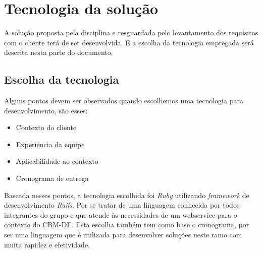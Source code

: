 \chapter[Tecnologia da solução]{Tecnologia da solução}

  A solução proposta pela disciplina e resguardada pelo levantamento dos requisitos com o cliente terá de ser desenvolvida.
  E a escolha da tecnologia empregada será descrita nesta parte do documento.
  
  \section{Escolha da tecnologia}
  
    Alguns pontos devem ser observados quando escolhemos uma tecnologia para desenvolvimento, são esses:
    
    \begin{itemize}
     \item Contexto do cliente
     \item Experiência da equipe
     \item Aplicabilidade ao contexto
     \item Cronograma de entrega
    \end{itemize}
    
    Baseada nesses pontos, a tecnologia escolhida foi \textit{Ruby} utilizando \textit{framework} de desenvolvimento \textit{Rails}.
    Por se tratar de uma linguagem conhecida por todos integrantes do grupo e que atende às necessidades 
    de um webservice para o contexto do CBM-DF. Esta escolha também tem como base o cronograma, 
    por ser uma linguagem que é utilizada para desenvolver soluções neste ramo com muita rapidez
    e efetividade. 
